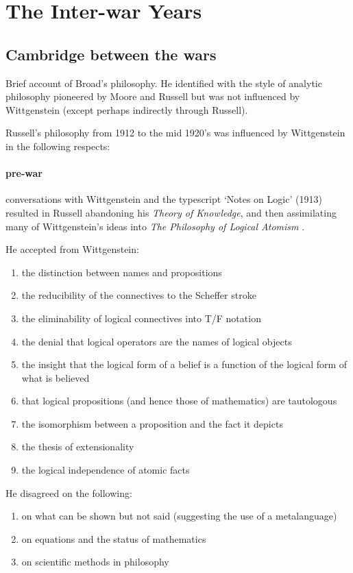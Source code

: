 \chapter{The Inter-war Years}

\section{Cambridge between the wars}

Brief account of Broad's philosophy.
He identified with the style of analytic philosophy pioneered by Moore and Russell but was not influenced by Wittgenstein (except perhaps indirectly through Russell).

Russell's philosophy from 1912 to the mid 1920's was influenced by Wittgenstein in the following respects:

\subsubsection{pre-war}

conversations with Wittgenstein and the typescript `Notes on Logic' (1913) resulted in Russell abandoning his {\it Theory of Knowledge}, and then assimilating many of Wittgenstein's ideas into {\it The Philosophy of Logical Atomism} \cite{russellPLA}.

He accepted from Wittgenstein:
\begin{enumerate}
\item the distinction between names and propositions
\item the reducibility of the connectives to the Scheffer stroke
\item the eliminability of logical connectives into T/F notation
\item the denial that logical operators are the names of logical objects
\item the insight that the logical form of a belief is a function of the logical form of what is believed
\item that logical propositions (and hence those of mathematics) are tautologous
\item the isomorphism between a proposition and the fact it depicts
\item the thesis of extensionality
\item the logical independence of atomic facts
\end{enumerate}

He disagreed on the following:
\begin{enumerate}
\item on what can be shown but not said (suggesting the use of a metalanguage)
\item on equations and the status of mathematics
\item on scientific methods in philosophy
\end{enumerate}

